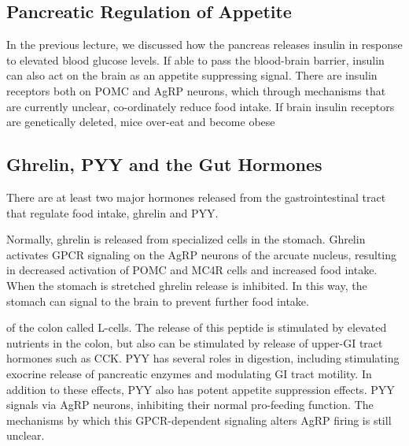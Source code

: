 \documentclass{tufte-handout}
\begin{document}
\subsection{Pancreatic Regulation of Appetite}

In the previous lecture, we discussed how the pancreas releases insulin in response to elevated blood glucose levels.  If able to pass the blood-brain barrier, insulin can also act on the brain as an appetite suppressing signal.  There are insulin receptors both on POMC and AgRP neurons, which through mechanisms that are currently unclear, co-ordinately reduce food intake. If brain insulin receptors are genetically deleted, mice over-eat and become obese\cite{Bruning2000} 

\subsection{Ghrelin, PYY and the Gut Hormones}

There are at least two major hormones released from the gastrointestinal tract that regulate food intake, ghrelin and  PYY.  

Normally, ghrelin is released from specialized cells in the stomach.   Ghrelin activates GPCR signaling on the AgRP neurons of the arcuate nucleus, resulting in decreased activation of POMC and MC4R cells and increased food intake.  When the stomach is stretched ghrelin release is inhibited.  In this way, the stomach can signal to the brain to prevent further food intake.

 of the colon called L-cells.  The release of this peptide is stimulated by elevated nutrients in the colon, but also can be stimulated by release of upper-GI tract hormones such as CCK.  PYY has several roles in digestion, including stimulating exocrine release of pancreatic enzymes and modulating GI tract motility.  In addition to these effects, PYY also has potent appetite suppression effects.  PYY signals via AgRP neurons, inhibiting their normal pro-feeding function.  The mechanisms by which this GPCR-dependent signaling alters AgRP firing is still unclear.
\end{document}
